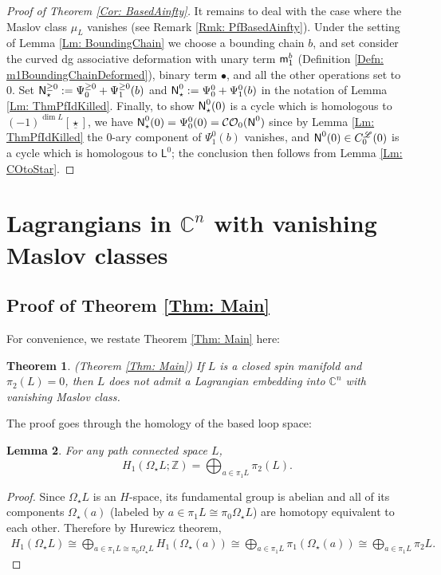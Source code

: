 \documentclass[10pt]{amsart}
\numberwithin{equation}{section}
\theoremstyle{plain}
\newtheorem{theorem}{Theorem}[section]
\newtheorem{lemma}[theorem]{Lemma}
\theoremstyle{definition}
\theoremstyle{remark}
\numberwithin{equation}{section}
\newcommand{\Z}{\mathbb{Z}}
\newcommand{\C}{\mathbb{C}}
\newcommand{\CO}{\mathcal{CO}}
\newcommand{\Cfr}[1]{C_{#1}^\mathscr{L}}
\newcommand{\mm}{\textup{\textsf{m}}}
\newcommand{\NN}{\textup{\textsf{N}}}
\newcommand{\NNN}{\textup{\textsf{N}}_\star}
\newcommand{\LL}{\textsf{L}}
\begin{document}
{\begin{proof}[Proof of Theorem \ref{Cor: BasedAinfty}]
	It remains to deal with the case where the Maslov class $\mu_L$ vanishes (see Remark \ref{Rmk: PfBasedAinfty}). 
	Under the setting of Lemma \ref{Lm: BoundingChain}  we choose a bounding chain $b$, and set consider the curved dg associative deformation with  unary term $\mm_1^b$ (Definition \ref{Defn: m1BoundingChainDeformed}), binary term $\bullet$, and all the other operations set to 0.
	Set $\NNN^{\geq 0} := \Psi_0^{\geq 0} + \Psi_1^{\geq 0}(b)$ and $\NNN^{0} := \Psi_0^{0} + \Psi_1^{0}(b)$
	in the notation of Lemma \ref{Lm: ThmPfIdKilled}.
	Finally, to show $\NNN^0(0)$ is a cycle which is homologous to $(-1)^{\dim L} [\underline{\star}]$, we have $\NNN^0(0)= \Psi_0^{0}(0)= \CO_0(\NN^{0})$ since by Lemma \ref{Lm: ThmPfIdKilled} the 0-ary component of $\Psi_1^{0}(b)$ vanishes, and $\NN^{0}(0) \in \Cfr{0}(0)$ is a cycle which is homologous to $\LL^0$; the conclusion then follows from Lemma \ref{Lm: COtoStar}.
\end{proof}




\bigskip

\section{Lagrangians in \texorpdfstring{$\C^n$}{Cn} with vanishing Maslov classes}
\label{Sec: MainProof}


 


\subsection{Proof of Theorem \ref{Thm: Main}}\label{Subsc: PfMainThm}
For convenience, we restate Theorem \ref{Thm: Main} here:
\begin{theorem}\label{Thm: MainRestate}(Theorem \ref{Thm: Main})
	If $L$ is a closed spin manifold and $\pi_2(L)=0$, then $L$ does not admit a Lagrangian embedding into $\C^n$ with vanishing Maslov class.
\end{theorem}



The proof goes through the homology of the based loop space:
\begin{lemma}\label{Lm: BasedHlgy}
For any path connected space $L$,
	\[H_1(\Omega_\star L;\Z) = \bigoplus_{a \in \pi_1 L} \pi_2(L).\]
\end{lemma}
\begin{proof}
	Since $\Omega_\star L$ is an $H$-space, its fundamental group is abelian and all of its components $\Omega_\star(a)$ (labeled by $a\in \pi_1 L\cong \pi_0\Omega_\star L$) are homotopy equivalent to each other. Therefore by Hurewicz theorem,
	\begin{align*}
		H_1(\Omega_\star L)\cong \bigoplus_{a\in \pi_1 L\cong \pi_0 \Omega_\star L} H_1(\Omega_\star (a)) \cong \bigoplus_{a\in \pi_1L} \pi_1(\Omega_\star (a)) \cong  \bigoplus_{a\in \pi_1 L} \pi_2 L.
	\end{align*}
\end{proof}



}
\end{document}

